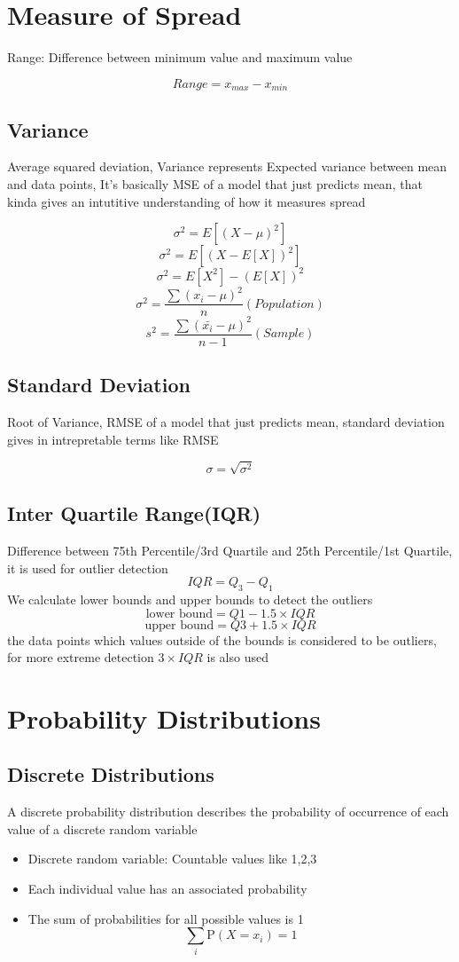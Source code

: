 \documentclass[12pt]{extarticle}
\begin{document}
\section{Measure of Spread}
Range: Difference between minimum value and maximum value 

$$ Range = x_{max} - x_{min} $$ 

\subsection{Variance}
Average squared deviation, Variance represents Expected variance between mean and data points,
It's basically MSE of a model that just predicts mean, that kinda gives an intutitive 
understanding of how it measures spread

$$\sigma^2 = E[(X - \mu)^2]$$
$$\sigma^2 = E[(X - E[X])^2]$$
$$\sigma^2 = E[X^2]-(E[X])^2$$
$$ \sigma^2 = \frac{\sum (x_i - \mu)^2}{n} (Population) $$ 
$$ s^2 = \frac{\sum( \bar{x_i} - \mu)^2}{n-1} (Sample)  $$ 

\subsection{Standard Deviation}
Root of Variance, 
RMSE of a model that just predicts mean, 
standard deviation gives in intrepretable terms like RMSE

$$ \sigma = \sqrt{\sigma^2} $$
\subsection{Inter Quartile Range(IQR)}
Difference between 75th Percentile/3rd Quartile and 25th Percentile/1st Quartile, 
it is used for outlier detection 
$$IQR = Q_3 - Q_1$$ 
We calculate lower bounds and upper bounds to detect the outliers
$$ \text{lower bound}= Q1-1.5 \times IQR$$
$$ \text{upper bound}= Q3+1.5 \times IQR$$
the data points which values outside of the bounds is considered to be outliers, for more extreme detection \(3 \times IQR\) is also used

\section{Probability Distributions}

\subsection{Discrete Distributions}
A discrete probability distribution describes the probability of occurrence of each value of a discrete random variable
\begin{itemize}
    \item Discrete random variable: Countable values like 1,2,3
    \item Each individual value has an associated probability 
    \item The sum of probabilities for all possible values is 1
    $$ \sum_i \mathrm{P}(X=x_i)=1$$
\end{itemize}
\end{document}
